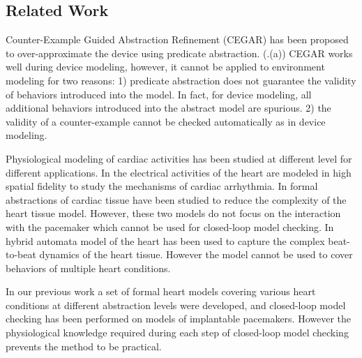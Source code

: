 \subsection{Related Work}
Counter-Example Guided Abstraction Refinement (CEGAR) \cite{CEGAR} has been proposed to over-approximate the device using predicate abstraction. (.(a))
CEGAR works well during device modeling, however, it cannot be applied to environment modeling for two reasons: 1) predicate abstraction does not guarantee the validity of behaviors introduced into the model. In fact, for device modeling, all additional behaviors introduced into the abstract model are spurious. 2) the validity of a counter-example cannot be checked automatically as in device modeling. 

Physiological modeling of cardiac activities has been studied at different level for different applications. In \cite{natalia} the electrical activities of the heart are modeled in high spatial fidelity to study the mechanisms of cardiac arrhythmia. In \cite{radu} formal abstractions of cardiac tissue have been studied to reduce the complexity of the heart tissue model. However, these two models do not focus on the interaction with the pacemaker which cannot be used for closed-loop model checking. In \cite{marta} hybrid automata model of the heart has been used to capture the complex beat-to-beat dynamics of the heart tissue. However the model cannot be used to cover behaviors of multiple heart conditions.

In our previous work \cite{sttt13} a set of formal heart models covering various heart conditions at different abstraction levels were developed, and closed-loop model checking has been performed on models of implantable pacemakers. 
However the physiological knowledge required during each step of closed-loop model checking prevents the method to be practical.

